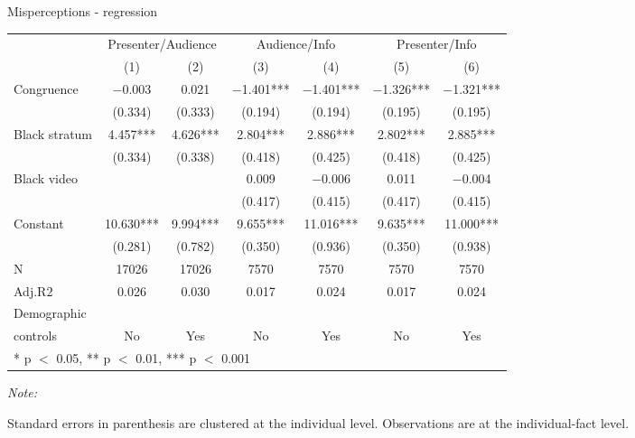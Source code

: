 \documentclass[10pt]{beamer}
\begin{document}
\begin{frame}{Misperceptions - regression}
\label{mainI_reg}
\begin{adjustbox}{width=\textwidth, totalheight=\textheight-\baselineskip,keepaspectratio}

\begin{threeparttable}
\begin{tabular}[t]{lcccccc}
\toprule
\multicolumn{1}{c}{ } & \multicolumn{2}{c}{Presenter/Audience} & \multicolumn{2}{c}{Audience/Info} & \multicolumn{2}{c}{Presenter/Info} \\
\cmidrule(l{3pt}r{3pt}){2-3} \cmidrule(l{3pt}r{3pt}){4-5} \cmidrule(l{3pt}r{3pt}){6-7}
  & (1) & (2) & (3) & (4) & (5) & (6)\\
\midrule
Congruence & \num{-0.003} & \num{0.021} & \num{-1.401}*** & \num{-1.401}*** & \num{-1.326}*** & \num{-1.321}***\\
 & (\num{0.334}) & (\num{0.333}) & (\num{0.194}) & (\num{0.194}) & (\num{0.195}) & (\num{0.195})\\
Black stratum & \num{4.457}*** & \num{4.626}*** & \num{2.804}*** & \num{2.886}*** & \num{2.802}*** & \num{2.885}***\\
 & (\num{0.334}) & (\num{0.338}) & (\num{0.418}) & (\num{0.425}) & (\num{0.418}) & (\num{0.425})\\
Black video &  &  & \num{0.009} & \num{-0.006} & \num{0.011} & \num{-0.004}\\
 &  &  & (\num{0.417}) & (\num{0.415}) & (\num{0.417}) & (\num{0.415})\\
Constant & \num{10.630}*** & \num{9.994}*** & \num{9.655}*** & \num{11.016}*** & \num{9.635}*** & \num{11.000}***\\
 & (\num{0.281}) & (\num{0.782}) & (\num{0.350}) & (\num{0.936}) & (\num{0.350}) & (\num{0.938})\\
\midrule
N & \num{17026} & \num{17026} & \num{7570} & \num{7570} & \num{7570} & \num{7570}\\
Adj.R$2$ & \num{0.026} & \num{0.030} & \num{0.017} & \num{0.024} & \num{0.017} & \num{0.024}\\
Demographic\\controls & No & Yes & No & Yes & No & Yes\\
\bottomrule
\multicolumn{7}{l}{\rule{0pt}{1em}* p $<$ 0.05, ** p $<$ 0.01, *** p $<$ 0.001}\\
\end{tabular}
\begin{tablenotes}[para]
\item \textit{Note: } 
\item Standard errors in parenthesis are clustered at the individual level. 
            Observations are at the individual-fact level. 
\end{tablenotes}
\end{threeparttable}
               \end{adjustbox}
 \hfill \hyperlink{mainI}{}
\end{frame}
\end{document}
